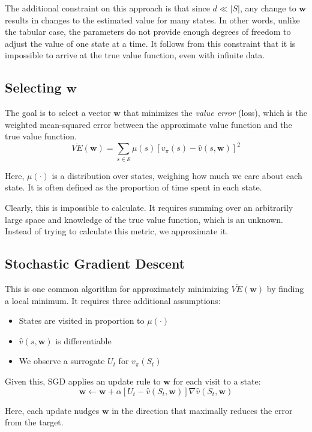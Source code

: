 \documentclass{article}
\begin{document}
The additional constraint on this approach is that since $d \ll |S|$, any change to $\mathbf{w}$ results in changes to the estimated value for 
many states. In other words, unlike the tabular case, the parameters do not provide enough degrees of freedom to adjust the value of one state
at a time. It follows from this constraint that it is impossible to arrive at the true value function, even with infinite data.

\subsection{Selecting $\mathbf{w}$}
The goal is to select a vector $\mathbf{w}$ that minimizes the \emph{value error} (loss), which is the weighted mean-squared error between the approximate value
function and the true value function.
\begin{equation}
  \overline{VE}(\mathbf{w}) = \sum_{s \in \mathcal{S}} \mu(s) [v_\pi(s) - \hat{v}(s, \mathbf{w})]^2
\end{equation}

Here, $\mu(\cdot)$ is a distribution over states, weighing how much we care about each state. It is often defined as the proportion of time spent in each state.

Clearly, this is impossible to calculate. It requires summing over an arbitrarily large space and knowledge of the true value function, which is
an unknown. Instead of trying to calculate this metric, we approximate it.

\subsection{Stochastic Gradient Descent}
This is one common algorithm for approximately minimizing $\overline{VE}(\mathbf{w})$ by finding a local minimum. It requires three additional assumptions:
\begin{itemize}
  \item States are visited in proportion to $\mu(\cdot)$
  \item $\hat{v}(s, \mathbf{w})$ is differentiable
  \item We observe a surrogate $U_t$ for $v_\pi(S_t)$
\end{itemize}

Given this, SGD applies an update rule to $\mathbf{w}$ for each visit to a state:
\begin{equation}
  \mathbf{w} \leftarrow \mathbf{w} + \alpha [U_t - \hat{v}(S_t, \mathbf{w})] \nabla \hat{v}(S_t, \mathbf{w})
\end{equation}

Here, each update nudges $\mathbf{w}$ in the direction that maximally reduces the error from the target.
\end{document}
